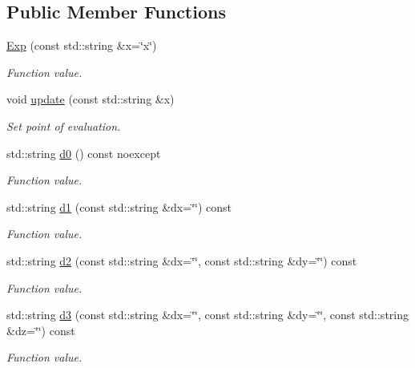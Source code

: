 \subsection*{Public Member Functions}
\begin{DoxyCompactItemize}
\item 
\hyperlink{structFunG_1_1texify_1_1Exp_a781def06b8991754ab8ede94835a0bb7}{Exp} (const std\-::string \&x=\char`\"{}x\char`\"{})
\begin{DoxyCompactList}\small\item\em Function value. \end{DoxyCompactList}\item 
void \hyperlink{structFunG_1_1texify_1_1Exp_ab4fccc070c983d0aebb5b4bc46930bfd}{update} (const std\-::string \&x)
\begin{DoxyCompactList}\small\item\em Set point of evaluation. \end{DoxyCompactList}\item 
std\-::string \hyperlink{structFunG_1_1texify_1_1Exp_a88d18f5948309158226a6a85e02c3009}{d0} () const noexcept
\begin{DoxyCompactList}\small\item\em Function value. \end{DoxyCompactList}\item 
std\-::string \hyperlink{structFunG_1_1texify_1_1Exp_a72d4392ee43c7e5ab78b9142fcd8713c}{d1} (const std\-::string \&dx=\char`\"{}\char`\"{}) const 
\begin{DoxyCompactList}\small\item\em Function value. \end{DoxyCompactList}\item 
std\-::string \hyperlink{structFunG_1_1texify_1_1Exp_a8213415ca7f51ebf0515e287a2feafb2}{d2} (const std\-::string \&dx=\char`\"{}\char`\"{}, const std\-::string \&dy=\char`\"{}\char`\"{}) const 
\begin{DoxyCompactList}\small\item\em Function value. \end{DoxyCompactList}\item 
std\-::string \hyperlink{structFunG_1_1texify_1_1Exp_a3e6d06ab346d0d076069cbfdba90b501}{d3} (const std\-::string \&dx=\char`\"{}\char`\"{}, const std\-::string \&dy=\char`\"{}\char`\"{}, const std\-::string \&dz=\char`\"{}\char`\"{}) const 
\begin{DoxyCompactList}\small\item\em Function value. \end{DoxyCompactList}\end{DoxyCompactItemize}


